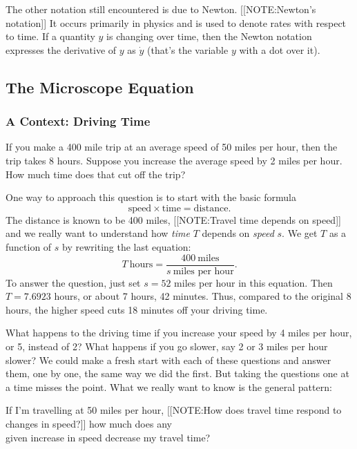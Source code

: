 The other notation still encountered is due to Newton.
[[NOTE:Newton's notation]]
It occurs primarily in physics and is used to denote rates with
respect to time.  If a quantity $y$ is changing over time, then the
Newton notation expresses the derivative of $y$ as $\dot{y}$ (that's
the variable $y$ with a dot over it).



\subsection{The Microscope Equation}
\label{subsec:the-microscope-equation}

\subsubsection{A Context: Driving Time}
\label{subsubsec:a-context-driving-time}

If you make a 400 mile trip at an average speed of 50 miles per hour,
then the trip takes 8 hours.  Suppose you increase the average speed
by 2 miles per hour.  How much time does that cut off the trip?

One way to approach this question is to start with the basic formula
\[
\mbox{speed} \times \mbox{time} = \mbox{distance}.
\]
The distance is known to be 400 miles, 
[[NOTE:Travel time  depends on speed]]
and we really want to understand how {\em time\/} $T$ depends on {\em
  speed\/} $s$.  We get $T$ as a function of $s$ by rewriting the last
equation:
\[
T \ \mbox{hours} 
  = \dfrac{400 \ \mbox{miles}}{s \ \mbox{miles per hour}}.
\]
To answer the question, just set $s = 52$ miles per hour in this
equation.  Then $T = 7.6923$ hours, or about 7 hours, 42 minutes.
Thus, compared to the original 8 hours, the higher speed cuts 18
minutes off your driving time.

What happens to the driving time if you increase your speed by 4 miles
per hour, or 5, instead of 2?  What happens if you go slower, say 2 or
3 miles per hour slower?  We could make a fresh start with each of
these questions and answer them, one by one, the same way we did the
first.  But taking the questions one at a time misses the point.  What
we really want to know is the general pattern:
\begin{center}
	If I'm travelling at 50 miles per hour, 
[[NOTE:How does travel time respond to  changes in speed?]]
how much does any \\
given increase in speed decrease my travel time?
\end{center}

